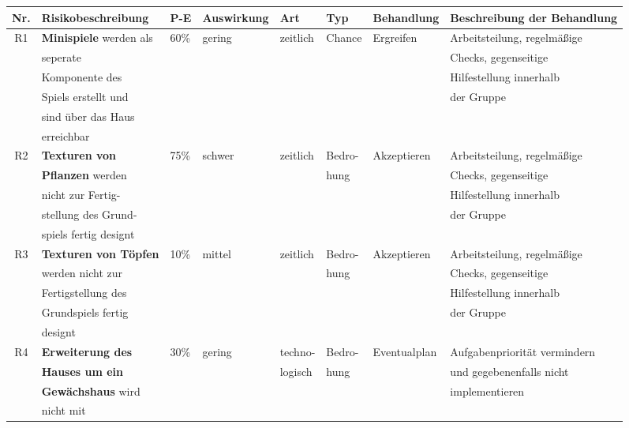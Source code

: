 \begin{table}[H]\label{tab:risk}
    \footnotesize
    \begin{tabular}{|c|l|l|l|l|l|l|l|}
        \hline
        Nr. & Risikobeschreibung & P-E & Auswirkung & Art & Typ & Behandlung & Beschreibung der Behandlung \\[0.5ex]
        \hline \hline
        R1 & \textbf{Minispiele} werden als & 60\% & gering & zeitlich & Chance & Ergreifen & Arbeitsteilung, regelmäßige\\
        & seperate &  &  &  &  && Checks, gegenseitige  \\
        & Komponente des &  &  & & &  & Hilfestellung innerhalb \\
        & Spiels erstellt und &  &&  &  &  & der Gruppe \\
        & sind über das Haus &  &  &  & & &  \\
        & erreichbar &  &  &  &  &&  \\
        \hline
        R2 & \textbf{Texturen von} & 75\% & schwer & zeitlich & Bedro- & Akzeptieren & Arbeitsteilung, regelmäßige \\
        & \textbf{Pflanzen} werden &  &&  & hung &  & Checks, gegenseitige  \\
        & nicht zur Fertig- &  &  &  & & & Hilfestellung innerhalb \\
        & stellung des Grund- &  &  &  &&  & der Gruppe \\
        & spiels fertig designt &  &  &  & & &  \\
        \hline
        R3 & \textbf{Texturen von Töpfen} & 10\% & mittel & zeitlich & Bedro- & Akzeptieren & Arbeitsteilung, regelmäßige \\
        & werden nicht zur &  &  &  &hung&  & Checks, gegenseitige \\
        & Fertigstellung des &  &  & & &  & Hilfestellung innerhalb \\
        & Grundspiels fertig &  &  &  &&  & der Gruppe \\
        & designt &  &  &  &  &&  \\
        \hline
        R4 & \textbf{Erweiterung des} & 30\% & gering & techno- & Bedro- & Eventualplan & Aufgabenpriorität vermindern \\
        & \textbf{Hauses um ein} &  &  & logisch & hung&  & und gegebenenfalls nicht \\
        & \textbf{Gewächshaus} wird &  &  & & &  & implementieren \\
        & nicht mit &  &  &  &  & & \\

\end{tabular}
\end{table}
